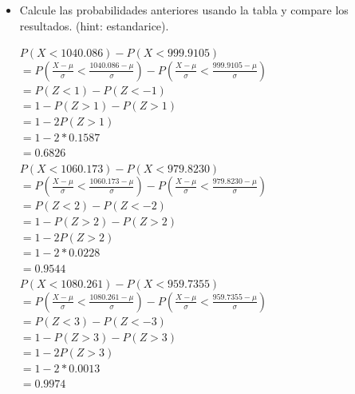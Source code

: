 \begin{itemize}
	\item Calcule las probabilidades anteriores usando la tabla y compare los resultados. (hint: estandarice).

	$P(X<1040.086)-P(X<999.9105)$\\
	$ = P(\frac{X-\mu}{\sigma} < \frac{1040.086-\mu}{\sigma}) - P(\frac{X-\mu}{\sigma} < \frac{999.9105-\mu}{\sigma})$\\
	$ = P(Z < 1) - P(Z < -1)$\\
	$ = 1 - P(Z > 1) - P(Z > 1)$\\
	$ = 1 - 2 P(Z > 1)$\\
	$ = 1 - 2 * 0.1587$\\
	$ = 0.6826$\\

        $P(X<1060.173)-P(X<979.8230)$\\
        $ = P(\frac{X-\mu}{\sigma} < \frac{1060.173-\mu}{\sigma}) - P(\frac{X-\mu}{\sigma} < \frac{979.8230-\mu}{\sigma})$\\
        $ = P(Z < 2) - P(Z < -2)$\\
	$ = 1 - P(Z > 2) - P(Z > 2)$\\
	$ = 1 - 2 P(Z > 2)$\\
	$ = 1 - 2 * 0.0228$\\
	$ = 0.9544$\\

        $P(X<1080.261)-P(X<959.7355)$\\
        $ = P(\frac{X-\mu}{\sigma} < \frac{1080.261-\mu}{\sigma}) - P(\frac{X-\mu}{\sigma} < \frac{959.7355-\mu}{\sigma})$\\
        $ = P(Z < 3) - P(Z < -3)$\\
	$ = 1 - P(Z > 3) - P(Z > 3)$\\
	$ = 1 - 2 P(Z > 3)$\\
	$ = 1 - 2 * 0.0013$\\
	$ = 0.9974$\\


\end{itemize}
